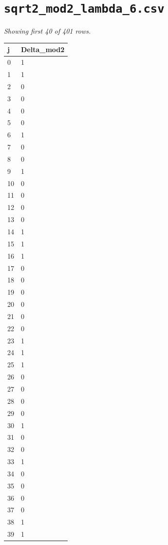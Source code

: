 \documentclass[10pt]{article}
\begin{document}
\section*{\texttt{sqrt2\_mod2\_lambda\_6.csv}}
\noindent\textit{Showing first 40 of 401 rows.}\par\medskip
{\footnotesize
\begin{longtable}{@{}ll@{}}
\toprule
\textbf{j} & \textbf{Delta\_mod2} \\
\midrule\endhead
0 & 1 \\
1 & 1 \\
2 & 0 \\
3 & 0 \\
4 & 0 \\
5 & 0 \\
6 & 1 \\
7 & 0 \\
8 & 0 \\
9 & 1 \\
10 & 0 \\
11 & 0 \\
12 & 0 \\
13 & 0 \\
14 & 1 \\
15 & 1 \\
16 & 1 \\
17 & 0 \\
18 & 0 \\
19 & 0 \\
20 & 0 \\
21 & 0 \\
22 & 0 \\
23 & 1 \\
24 & 1 \\
25 & 1 \\
26 & 0 \\
27 & 0 \\
28 & 0 \\
29 & 0 \\
30 & 1 \\
31 & 0 \\
32 & 0 \\
33 & 1 \\
34 & 0 \\
35 & 0 \\
36 & 0 \\
37 & 0 \\
38 & 1 \\
39 & 1 \\
\bottomrule
\end{longtable}}
\end{document}
